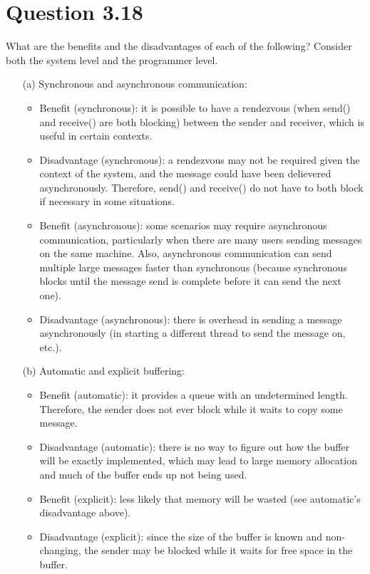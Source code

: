 \documentclass[12pt]{article}
\begin{document}
\section*{Question 3.18} {\color{blue}What are the benefits and the disadvantages of each of the following? Consider both the system level and the programmer level.
\begin{enumerate}
\item[(a)]Synchronous and asynchronous communication: {\color{black}
\begin{itemize}
\item Benefit (synchronous): it is possible to have a rendezvous (when send() and receive() are both blocking) between the sender and receiver, which is useful in certain contexts.
\item Disadvantage (synchronous): a rendezvous may not be required given the context of the system, and the message could have been delievered asynchronously. Therefore, send() and receive() do not have to both block if necessary in some situations.
\item Benefit (asynchronous): some scenarios may require asynchronous communication, particularly when there are many users sending messages on the same machine. Also, asynchronous communication can send multiple large messages faster than synchronous (because synchronous blocks until the message send is complete before it can send the next one).
\item Disadvantage (asynchronous): there is overhead in sending a message asynchronously (in starting a different thread to send the message on, etc.).
\end{itemize}
}

\item[(b)]Automatic and explicit buffering: {\color{black}
\begin{itemize}
\item Benefit (automatic): it provides a queue with an undetermined length. Therefore, the sender does not ever block while it waits to copy some message. 
\item Disadvantage (automatic): there is no way to figure out how the buffer will be exactly implemented, which may lead to large memory allocation and much of the buffer ends up not being used. 
\item Benefit (explicit): less likely that memory will be wasted (see automatic's disadvantage above).
\item Disadvantage (explicit): since the size of the buffer is known and non-changing, the sender may be blocked while it waits for free space in the buffer.
\end{itemize}
}


\end{enumerate}}
\end{document}
